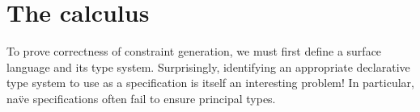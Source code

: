 \documentclass[acmsmall,screen,nonacm,review]{acmart}
\begin{document}
\section{The \OML calculus}
\label{sec:language}



To prove correctness of constraint generation, we must first define a surface
language and its type system. Surprisingly, identifying an appropriate
declarative type system to use as a specification is itself an interesting
problem! In particular, na\"ve specifications often fail to ensure principal types.

\end{document}

